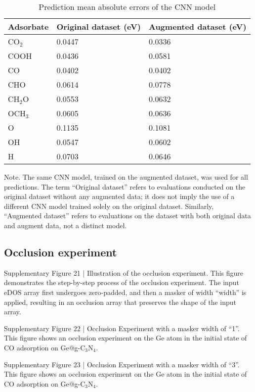 \begin{table}[h]
  \centering
  \begin{tabular}{lll}
    \hline
    \textbf{Adsorbate} & \textbf{Original dataset (eV)} & \textbf{Augmented dataset (eV)} \\
    \hline
    CO$_2$  & 0.0447 & 0.0336 \\
    COOH    & 0.0436 & 0.0581 \\
    CO      & 0.0402 & 0.0402 \\
    CHO     & 0.0614 & 0.0778 \\
    CH$_2$O & 0.0553 & 0.0632 \\
    OCH$_3$ & 0.0605 & 0.0636 \\
    O       & 0.1135 & 0.1081 \\
    OH      & 0.0547 & 0.0602 \\
    H       & 0.0703 & 0.0646 \\
    \hline
  \end{tabular}
  \caption{Prediction mean absolute errors of the CNN model}
  \label{si_table18}
\end{table}

Note. The same CNN model, trained on the augmented dataset, was used for all predictions. The term “Original dataset” refers to evaluations conducted on the original dataset without any augmented data; it does not imply the use of a different CNN model trained solely on the original dataset. Similarly, “Augmented dataset” refers to evaluations on the dataset with both original data and augment data, not a distinct model.

\subsection{Occlusion experiment}

Supplementary Figure 21 | Illustration of the occlusion experiment. This figure demonstrates the step-by-step process of the occlusion experiment. The input eDOS array first undergoes zero-padded, and then a masker of width “width” is applied, resulting in an occlusion array that preserves the shape of the input array.


Supplementary Figure 22 | Occlusion Experiment with a masker width of “1”. This figure shows an occlusion experiment on the Ge atom in the initial state of CO adsorption on Ge@g-C$_3$N$_4$.


Supplementary Figure 23 | Occlusion Experiment with a masker width of “3”. This figure shows an occlusion experiment on the Ge atom in the initial state of CO adsorption on Ge@g-C$_3$N$_4$.


